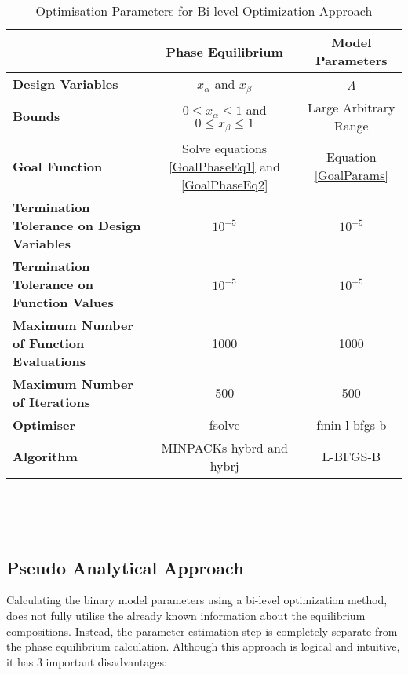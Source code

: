 \begin{landscape}
\vspace*{\fill}
\begin{table}[hp]
\caption{Optimisation Parameters for Bi-level Optimization Approach}
\centering
\begin{tabular}{lcc}
\toprule
&\textbf{Phase Equilibrium} & \textbf{Model Parameters}\\
\midrule
\textbf{Design Variables}&$x_{\alpha}$ and $x_{\beta}$&$\overline{\Lambda}$\\
\textbf{Bounds}&$0 \leq x_{\alpha} \leq 1$ and $0 \leq x_{\beta} \leq 1 $&Large Arbitrary Range\\
\textbf{Goal Function}& Solve equations \ref{GoalPhaseEq1} and \ref{GoalPhaseEq2}&Equation \ref{GoalParams} \\
\textbf{Termination Tolerance on Design Variables}&$10^{-5}$&$10^{-5}$\\
\textbf{Termination Tolerance on Function Values}&$10^{-5}$&$10^{-5}$\\
\textbf{Maximum Number of Function Evaluations}&1000&1000\\
\textbf{Maximum Number of Iterations}&500&500\\				
\textbf{Optimiser }&fsolve&fmin-l-bfgs-b\\
\textbf{Algorithm}&MINPACKs hybrd and hybrj& L-BFGS-B \\
\bottomrule
\end{tabular}\\
\label{OptParam}			
\end{table}\
\vspace*{\fill}
\end{landscape}

				
\subsection{Pseudo Analytical Approach}\label{BinaryPAMethodSection}

Calculating the binary model parameters using a bi-level optimization method, does not fully utilise the already known information about the equilibrium compositions. Instead, the parameter estimation step is completely separate from the phase equilibrium calculation. Although this approach is logical and intuitive, it has 3 important disadvantages:\

